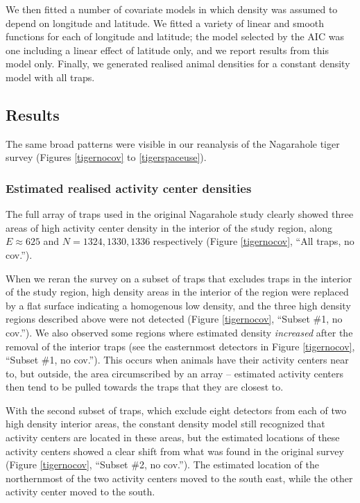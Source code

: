 \documentclass[10pt,a4paper]{article}
\begin{document}
We then fitted a number of covariate models in which density was assumed to depend on longitude and latitude. We fitted a variety of linear and smooth functions for each of longitude and latitude; the model selected by the AIC was one including a linear effect of latitude only, and we report results from this model only. Finally, we generated realised animal densities for a constant density model with all traps.

\subsection{Results} 
The same broad patterns were visible in our reanalysis of the Nagarahole tiger survey (Figures \ref{tigernocov} to \ref{tigerspaceuse}). 

\subsubsection{Estimated realised activity center densities}

The full array of traps used in the original Nagarahole study clearly showed three areas of high activity center density in the interior of the study region, along $E\approx 625$ and $N=1324, 1330, 1336$ respectively (Figure \ref{tigernocov}, ``All traps, no cov.''). 

When we reran the survey on a subset of traps that excludes traps in the interior of the study region, high density areas in the interior of the region were replaced by a flat surface indicating a homogenous low density, and the three high density regions described above were not detected  (Figure \ref{tigernocov}, ``Subset \#1, no cov.''). We also observed some regions where estimated density {\it increased} after the removal of the interior traps (see the easternmost detectors in Figure \ref{tigernocov}, ``Subset \#1, no cov.''). This occurs when animals have their activity centers near to, but outside, the area circumscribed by an array -- estimated activity centers then tend to be pulled towards the traps that they are closest to. 

With the second subset of traps, which exclude eight detectors from each of two high density interior areas, the constant density model still recognized that activity centers are located in these areas, but the estimated locations of these activity centers showed a clear shift from what was found in the original survey (Figure \ref{tigernocov}, ``Subset \#2, no cov.''). The estimated location of the northernmost of the two activity centers moved to the south east, while the other activity center moved to the south.
\end{document}
